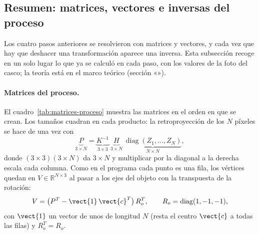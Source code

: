 
\subsection{Resumen: matrices, vectores e inversas del proceso}\label{sec:algebra-proceso}

Los cuatro pasos anteriores se resolvieron con matrices y vectores, y cada vez que hay que deshacer una transformación aparece una
inversa. Esta subsección recoge en un solo lugar lo que ya se calculó en cada paso, con los valores de la foto del casco; la teoría
está en el marco teórico (sección «»).

\paragraph{Matrices del proceso.} El cuadro~\ref{tab:matrices-proceso} muestra las matrices en el orden en que se crean. Los tamaños
cuadran en cada producto: la retroproyección de los $N$ píxeles se hace de una vez con
\begin{equation}
\underbrace{P}_{3\times N}=\underbrace{K^{-1}}_{3\times3}\ \underbrace{H}_{3\times N}\ \underbrace{\operatorname{diag}(Z_1,\dots,Z_N)}_{N\times N},
\end{equation}
donde $(3\times3)(3\times N)$ da $3\times N$ y multiplicar por la diagonal a la derecha escala cada columna. Como en el programa cada punto es una
fila, los vértices quedan en $V\in\mathbb{R}^{N\times3}$ al pasar a los ejes del objeto con la transpuesta de la rotación:
\begin{equation}
V=\bigl(P^{T}-\vect{1}\,\vect{c}^{T}\bigr)\,R_o^{T},\qquad R_o=\operatorname{diag}(1,-1,-1),
\end{equation}
con $\vect{1}$ un vector de unos de longitud $N$ (resta el centro $\vect{c}$ a todas las filas) y $R_o^{T}=R_o$.


